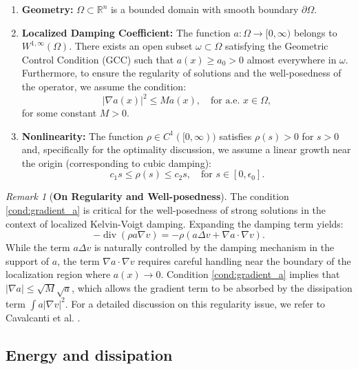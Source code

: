 \documentclass[11pt,reqno]{amsart}
\theoremstyle{remark}
\newtheorem{remark}[theorem]{Remark}
\begin{document}
\begin{enumerate}
    \item[(H1)] \textbf{Geometry:} $\Omega \subset \mathbb{R}^n$ is a bounded domain with smooth boundary $\partial\Omega$.
    \item[(H2)] \textbf{Localized Damping Coefficient:} The function $a: \Omega \to [0, \infty)$ belongs to $W^{1,\infty}(\Omega)$. There exists an open subset $\omega \subset \Omega$ satisfying the Geometric Control Condition (GCC) such that $a(x) \ge a_0 > 0$ almost everywhere in $\omega$. Furthermore, to ensure the regularity of solutions and the well-posedness of the operator, we assume the condition:
    \begin{equation}\label{cond:gradient_a}
        |\nabla a(x)|^2 \le M a(x), \quad \text{for a.e. } x \in \Omega,
    \end{equation}
    for some constant $M > 0$.
    \item[(H3)] \textbf{Nonlinearity:} The function $\rho \in C^1([0, \infty))$ satisfies $\rho(s) > 0$ for $s > 0$ and, specifically for the optimality discussion, we assume a linear growth near the origin (corresponding to cubic damping):
    \begin{equation}\label{eq:rho_linear_KV}
        c_1 s \le \rho(s) \le c_2 s, \quad \text{for } s \in [0, \epsilon_0].
    \end{equation}
\end{enumerate}



\begin{remark}[\textbf{On Regularity and Well-posedness}]\label{rem:well_posedness}
    The condition \eqref{cond:gradient_a} is critical for the well-posedness of strong solutions in the context of localized Kelvin-Voigt damping. Expanding the damping term yields:
    \[
        -\operatorname{div}(\rho a \nabla v) = -\rho (a \Delta v + \nabla a \cdot \nabla v).
    \]
    While the term $a \Delta v$ is naturally controlled by the damping mechanism in the support of $a$, the term $\nabla a \cdot \nabla v$ requires careful handling near the boundary of the localization region where $a(x) \to 0$. Condition \eqref{cond:gradient_a} implies that $|\nabla a| \le \sqrt{M}\sqrt{a}$, which allows the gradient term to be absorbed by the dissipation term $\int a |\nabla v|^2$. For a detailed discussion on this regularity issue, we refer to Cavalcanti et al. \cite{Cavalcanti2025}.
\end{remark}

\subsection{Energy and dissipation}
\end{document}
